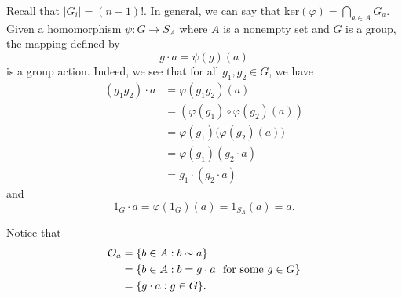 Recall that \( | {G}_{i} | = (n-1)! \). In general, we can say that \( \text{ker}(\varphi) = \bigcap_{  a \in A  }^{  }  {G}_{a} \). Given a homomorphism \( \psi : G \to {S}_{A} \) where \( A  \) is a nonempty set and \( G  \) is a group, the mapping defined by 
\[  g \cdot a = \psi(g)(a) \] is a group action. Indeed, we see that for all \( {g}_{1}, {g}_{2} \in G  \), we have 
\begin{align*}
    ({g}_{1} {g}_{2}) \cdot a &= \varphi({g}_{1}{g}_{2})(a) \\
                              &= (\varphi({g}_{1}) \circ \varphi({g}_{2})(a)) \\
                              &= \varphi({g}_{1})\Big(\varphi({g}_{2})(a) \Big) \\
                              &= \varphi({g}_{1})({g}_{2} \cdot a ) \\
                              &= {g}_{1} \cdot ({g}_{2} \cdot a )
\end{align*}
and
\[  {1}_{G} \cdot a = \varphi({1}_{G})(a) = {1}_{{S}_{A}}(a) = a.   \]


Notice that 
    \begin{align*}
        \mathcal{O}_a &= \{  b \in A : b \sim a  \}  \\
                      &= \{  b \in A : b = g \cdot a \ \ \text{for some \( g \in G  \)} \} \\
                      &= \{  g \cdot a : g \in G  \}.
    \end{align*}


